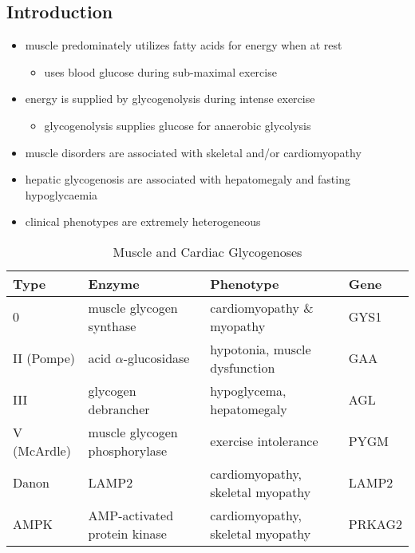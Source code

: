 \documentclass{scrartcl}
\begin{document}
\subsection{Introduction}
\label{sec:org2f92940}
\begin{itemize}
\item muscle predominately utilizes fatty acids for energy when at rest
\begin{itemize}
\item uses blood glucose during sub-maximal exercise
\end{itemize}
\item energy is supplied by glycogenolysis during intense exercise
\begin{itemize}
\item glycogenolysis supplies glucose for anaerobic glycolysis
\end{itemize}
\item muscle disorders are associated with skeletal and/or
cardiomyopathy
\item hepatic glycogenosis are associated with hepatomegaly and fasting
hypoglycaemia
\item clinical phenotypes are extremely heterogeneous
\end{itemize}

\begin{table}[htbp]
\caption{\label{tab:org70a1336}Muscle and Cardiac Glycogenoses}
\centering
\begin{tabular}{llll}
Type & Enzyme & Phenotype & Gene\\
\hline
0 & muscle glycogen synthase & cardiomyopathy \& myopathy & GYS1\\
II (Pompe) & acid \(\alpha\)-glucosidase & hypotonia, muscle dysfunction & GAA\\
III & glycogen debrancher & hypoglycema, hepatomegaly & AGL \footnotemark\\
V (McArdle) & muscle glycogen phosphorylase & exercise intolerance & PYGM\\
Danon & LAMP2 & cardiomyopathy, \textpm{} skeletal myopathy & LAMP2\\
AMPK & AMP-activated protein kinase & cardiomyopathy, \textpm{} skeletal myopathy & PRKAG2\\
\end{tabular}
\end{table}
\end{document}
